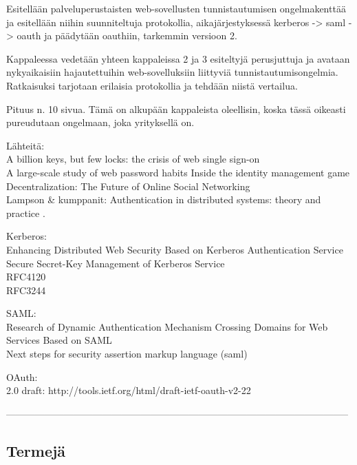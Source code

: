 Esitellään palveluperustaisten web-sovellusten tunnistautumisen ongelmakenttää ja esitellään niihin suunniteltuja protokollia, aikajärjestyksessä kerberos -> saml -> oauth ja päädytään oauthiin, tarkemmin versioon 2.

Kappaleessa vedetään yhteen kappaleissa 2 ja 3 esiteltyjä perusjuttuja ja avataan nykyaikaisiin hajautettuihin web-sovelluksiin liittyviä tunnistautumisongelmia. Ratkaisuksi tarjotaan erilaisia protokollia ja tehdään niistä vertailua.

Pituus n. 10 sivua. Tämä on alkupään kappaleista oleellisin, koska tässä oikeasti pureudutaan ongelmaan, joka yrityksellä on.

Lähteitä:\\
A billion keys, but few locks: the crisis of web single sign-on \cite{billion_keys}\\
A large-scale study of web password habits \cite{password_habits}
Inside the identity management game \cite{inside_the_identity_management_game}\\
Decentralization: The Future of Online Social Networking \cite{decentralisations}\\
Lampson \& kumppanit: Authentication in distributed systems: theory and practice \cite{lampson}.

Kerberos:\\
Enhancing Distributed Web Security Based on Kerberos Authentication Service \cite{enchancing_distributed_web_security}\\
Secure Secret-Key Management of Kerberos Service \cite{secure_secret_key}\\
RFC4120 \cite{rfc4120}\\
RFC3244 \cite{rfc3244}

SAML:\\
Research of Dynamic Authentication Mechanism Crossing Domains for Web Services Based on SAML \cite{dynamic_saml}\\
Next steps for security assertion markup language (saml) \cite{next_saml}

OAuth:\\
2.0 draft: http://tools.ietf.org/html/draft-ietf-oauth-v2-22 \cite{oauth2_0}

-----------------------------------------------------------------------------------------------------------


\subsection{Termejä}

